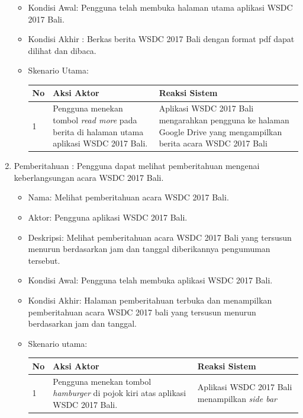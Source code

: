 \begin{enumerate}
\begin{itemize}
		\item Kondisi Awal: Pengguna telah membuka halaman utama aplikasi WSDC 2017 Bali.
		\item Kondisi Akhir : Berkas berita WSDC 2017 Bali dengan format pdf dapat dilihat dan dibaca.
		\item Skenario Utama: \\
		\begin{table}[H]
			\centering
			\begin{tabular}{|p{0.5cm}|p{7cm}|p{7cm}|}
				\hline
				No & Aksi Aktor                               & Reaksi Sistem                                          \\ \hline
				1  & Pengguna menekan tombol {\it read more} pada berita di halaman utama aplikasi WSDC 2017 Bali. & Aplikasi WSDC 2017 Bali mengarahkan pengguna ke halaman Google Drive yang mengampilkan berita acara WSDC 2017 Bali \\ \hline
			\end{tabular}
		\end{table}
	\end{itemize}
	\item Pemberitahuan : Pengguna dapat melihat pemberitahuan mengenai keberlangsungan acara WSDC 2017 Bali.
	\begin{itemize}
		\item Nama: Melihat pemberitahuan acara WSDC 2017 Bali.
		\item Aktor: Pengguna aplikasi WSDC 2017 Bali.
		\item Deskripsi: Melihat pemberitahuan acara WSDC 2017 Bali yang tersusun menurun berdasarkan jam dan tanggal diberikannya pengumuman tersebut.
		\item Kondisi Awal: Pengguna telah membuka aplikasi WSDC 2017 Bali.
		\item Kondisi Akhir: Halaman pemberitahuan terbuka dan menampilkan pemberitahuan acara WSDC 2017 bali yang tersusun menurun berdasarkan jam dan tanggal.
		\item Skenario utama: \\
		\begin{table}[H]
			\centering
			\begin{tabular}{|p{0.5cm}|p{7cm}|p{7cm}|}
				\hline
				No & Aksi Aktor                               & Reaksi Sistem                                          \\ \hline
				1  & Pengguna menekan tombol {\it hamburger} di pojok kiri atas aplikasi WSDC 2017 Bali. & Aplikasi WSDC 2017 Bali menampilkan {\it side bar} \\ \hline

\end{tabular}
\end{table}
\end{itemize}
\end{enumerate}
